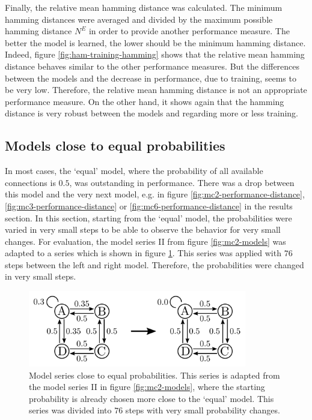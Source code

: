 Finally, the relative mean hamming distance was calculated. The minimum hamming distances were averaged and divided by the maximum possible hamming distance $N^E$ in order to provide another performance measure. The better the model is learned, the lower should be the minimum hamming distance. Indeed, figure \ref{fig:ham-training-hamming} shows that the relative mean hamming distance behaves similar to the other performance measures. But the differences between the models and the decrease in performance, due to training, seems to be very low. Therefore, the relative mean hamming distance is not an appropriate performance measure. On the other hand, it shows again that the hamming distance is very robust between the models and regarding more or less training.

\newpage

\subsection{Models close to equal probabilities}
\label{sec:appendix:close}

In most cases, the `equal' model, where the probability of all available connections is $0.5$, was outstanding in performance. There was a drop between this model and the very next model, e.g. in figure \ref{fig:mc2-performance-distance}, \ref{fig:mc3-performance-distance} or \ref{fig:mc6-performance-distance} in the results section. In this section, starting from the `equal' model, the probabilities were varied in very small steps to be able to observe the behavior for very small changes. For evaluation, the model series II from figure \ref{fig:mc2-models} was adapted to a series which is shown in figure \ref{fig:mc2b-models}. This series was applied with $76$ steps between the left and right model. Therefore, the probabilities were changed in very small steps.

\begin{figure}[!h]
	\centering
	\includegraphics[width=0.85\textwidth]{appendix/mc2b_models}
	\caption[Model series close to equal probabilities]{Model series close to equal probabilities. This series is adapted from the model series II in figure \ref{fig:mc2-models}, where the starting probability is already chosen more close to the `equal' model. This series was divided into $76$ steps with very small probability changes.}
	\label{fig:mc2b-models}
\end{figure}

